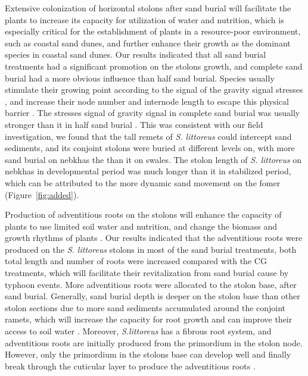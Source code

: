\documentclass[]{interact}
\theoremstyle{plain}%
\theoremstyle{definition}
\theoremstyle{remark}
\begin{document}
Extensive colonization of horizontal stolons after sand burial will facilitate the plants to increase its capacity for utilization of water and nutrition, which is especially critical for the establishment of plants in a resource-poor environment, such as coastal sand dunes, and further enhance their growth as the dominant species in coastal sand dunes. Our results indicated that all sand burial treatments had a significant promotion on the  stolons growth, and complete sand burial had a more obvious influence than half sand burial. Species usually stimulate their growing point according to the signal of the gravity signal stresses \citep{zhouAnalysisgrowthstrategy2015}, and increase their node number and internode length to escape this physical barrier \citep{maunEffectsBurialSand1996}. The stresses signal of gravity signal in complete sand burial was usually stronger than it in half sand burial \citep{wangAdvancesStudiesMorphological2005}. This was consistent with our field investigation, we found that the tall remets of \textit{S. littoreus} could intercept sand sediments, and its conjoint stolons were buried at different levels on, with more sand burial on nebkhas the than it on swales. The stolon length of \textit{S. littoreus} on nebkhas in developmental period was much longer than it in stabilized period, which can be attributed to the more dynamic sand movement on the fomer (Figure~\ref{fig:added}). 

Production of adventitious roots on the stolons will enhance the capacity of plants to use limited soil water and nutrition, and change the biomass and growth rhythms of plants \citep{martinezResponsesDuneMosses1999,dechAdventitiousRootProduction2006}. Our results indicated that the adventitious roots were produced on the \textit{S. littoreus} stolons in most of the sand burial treatments, both total length and number of roots were increased compared with the CG treatments, which will facilitate their revitalization from sand burial cause by typhoon events. More adventitious roots were allocated to the stolon base, after sand burial. Generally, sand burial depth is deeper on the stolon base than other stolon sections due to more sand sediments accumulated around the conjoint ramets, which will increase the capacity for root growth and can improve their access to soil water \citep{yuanEffectsSandAccretion1993}. Moreover, \textit{S.littoreus} has a fibrous root system, and adventitious roots are initially produced from the primordium in the stolon node. However, only the primordium in the stolons base can develop well and finally break through the cuticular layer to produce the adventitious roots \citep{hochholdingerWeedsCropsGenetic2004}. 
\end{document}

